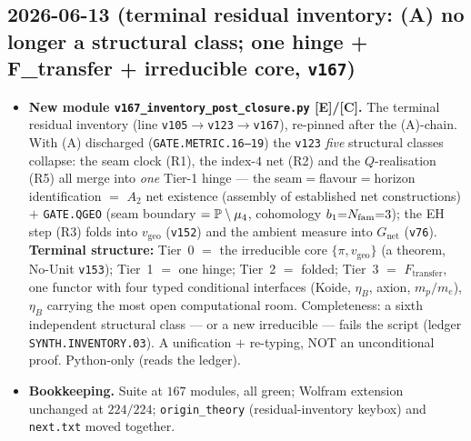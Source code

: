 \documentclass[11pt]{article}
\providecommand{\mE}{\textbf{[E]}}\providecommand{\mC}{\textbf{[C]}}
\providecommand{\vref}[1]{\texttt{#1}}
\begin{document}
\subsection*{2026-06-13 (terminal residual inventory: (A) no longer a structural class; one hinge + F\_transfer + irreducible core, \vref{v167})}
\begin{itemize}
\item \textbf{New module \texttt{v167\_inventory\_post\_closure.py} \mE/\mC.} The terminal residual
  inventory (line \vref{v105}$\to$\vref{v123}$\to$\vref{v167}), re-pinned after the (A)-chain. With (A)
  discharged (\texttt{GATE.METRIC.16--19}) the \vref{v123} \emph{five} structural classes collapse: the
  seam clock (R1), the index-$4$ net (R2) and the $Q$-realisation (R5) all merge into \emph{one} Tier-1
  hinge --- the seam$=$flavour$=$horizon identification $=$ $A_2$ net existence (assembly of established
  net constructions) $+$ \texttt{GATE.QGEO} (seam boundary $=\mathbb{P}\setminus\mu_4$, cohomology
  $b_1{=}N_{\mathrm{fam}}{=}3$); the EH step (R3) folds into $v_{\mathrm{geo}}$ (\vref{v152}) and the ambient measure
  into $G_{\mathrm{net}}$ (\vref{v76}). \textbf{Terminal structure:} Tier~0 $=$ the irreducible core
  $\{\pi,v_{\mathrm{geo}}\}$ (a theorem, No-Unit \vref{v153}); Tier~1 $=$ one hinge; Tier~2 $=$ folded;
  Tier~3 $=$ $F_{\mathrm{transfer}}$, one functor with four typed conditional interfaces (Koide, $\eta_B$,
  axion, $m_p/m_e$), $\eta_B$ carrying the most open computational room. Completeness: a sixth independent
  structural class --- or a new irreducible --- fails the script (ledger \texttt{SYNTH.INVENTORY.03}). A
  unification $+$ re-typing, NOT an unconditional proof. Python-only (reads the ledger).
\item \textbf{Bookkeeping.} Suite at $167$ modules, all green; Wolfram extension unchanged at $224/224$;
  \texttt{origin\_theory} (residual-inventory keybox) and \texttt{next.txt} moved together.
\end{itemize}
\end{document}
